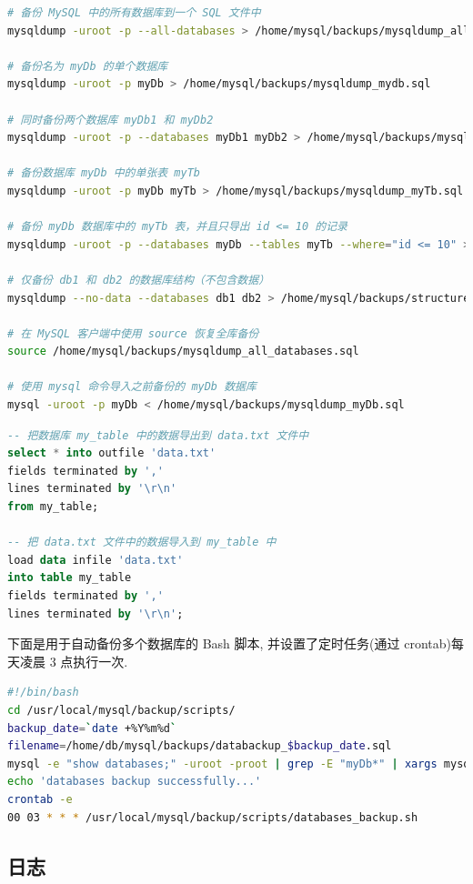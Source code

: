 \begin{lstlisting}[language=bash]
# 备份 MySQL 中的所有数据库到一个 SQL 文件中
mysqldump -uroot -p --all-databases > /home/mysql/backups/mysqldump_all_databases.sql

# 备份名为 myDb 的单个数据库
mysqldump -uroot -p myDb > /home/mysql/backups/mysqldump_mydb.sql

# 同时备份两个数据库 myDb1 和 myDb2
mysqldump -uroot -p --databases myDb1 myDb2 > /home/mysql/backups/mysqldump_databases_mydb12.sql

# 备份数据库 myDb 中的单张表 myTb
mysqldump -uroot -p myDb myTb > /home/mysql/backups/mysqldump_myTb.sql

# 备份 myDb 数据库中的 myTb 表，并且只导出 id <= 10 的记录
mysqldump -uroot -p --databases myDb --tables myTb --where="id <= 10" > /home/mysql/backups/mysqldump_myTb10.sql

# 仅备份 db1 和 db2 的数据库结构（不包含数据）
mysqldump --no-data --databases db1 db2 > /home/mysql/backups/structure.sql

# 在 MySQL 客户端中使用 source 恢复全库备份
source /home/mysql/backups/mysqldump_all_databases.sql

# 使用 mysql 命令导入之前备份的 myDb 数据库
mysql -uroot -p myDb < /home/mysql/backups/mysqldump_myDb.sql
\end{lstlisting}

\begin{lstlisting}[language=sql]
-- 把数据库 my_table 中的数据导出到 data.txt 文件中
select * into outfile 'data.txt'
fields terminated by ','
lines terminated by '\r\n'
from my_table;

-- 把 data.txt 文件中的数据导入到 my_table 中
load data infile 'data.txt'
into table my_table
fields terminated by ','
lines terminated by '\r\n';
\end{lstlisting}

下面是用于自动备份多个数据库的 Bash 脚本, 并设置了定时任务(通过 crontab)每天凌晨 3 点执行一次.
\begin{lstlisting}[language=bash]
#!/bin/bash
cd /usr/local/mysql/backup/scripts/
backup_date=`date +%Y%m%d`
filename=/home/db/mysql/backups/databackup_$backup_date.sql
mysql -e "show databases;" -uroot -proot | grep -E "myDb*" | xargs mysqldump -uroot -proot --databases > $filename
echo 'databases backup successfully...'
crontab -e
00 03 * * * /usr/local/mysql/backup/scripts/databases_backup.sh
\end{lstlisting}

\subsection{日志}

